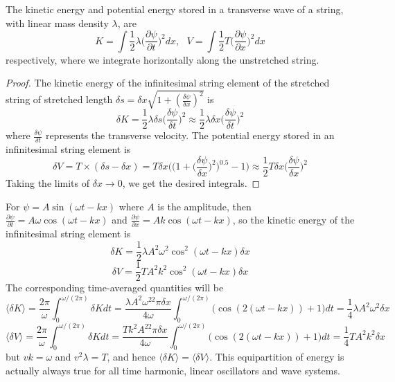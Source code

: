 \documentclass[a4paper]{article}
\begin{document}
\begin{thm}
The kinetic energy and potential energy stored in a transverse wave of a string, with linear mass density $\lambda$, are 
$$K=\int\frac{1}{2}\lambda\bigg(\frac{\partial\psi}{\partial t}\bigg)^2dx, \text{  }V=\int\frac{1}{2}T\bigg(\frac{\partial\psi}{\partial x}\bigg)^2dx$$
respectively, where we integrate horizontally along the unstretched string.
\end{thm}
\begin{proof}
The kinetic energy of the infinitesimal string element of the stretched string of stretched length $\delta s=\delta x\sqrt{1+(\frac{\delta\psi}{\delta x})^2}$ is
$$\delta K=\frac{1}{2}\lambda\delta s\bigg(\frac{\delta\psi}{\delta t}\bigg)^2\approx\frac{1}{2}\lambda\delta x\bigg(\frac{\delta\psi}{\delta t}\bigg)^2$$
where $\frac{\delta\psi}{\delta t}$ represents the transverse velocity.
The potential energy stored in an infinitesimal string element is
$$\delta V=T\times(\delta s-\delta x)=T\delta x\bigg(\bigg(1+\bigg(\frac{\delta\psi}{\delta x}\bigg)^2\bigg)^{0.5}-1\bigg)\approx\frac{1}{2}T\delta x\bigg(\frac{\delta\psi}{\delta x}\bigg)^2$$
Taking the limits of $\delta x\rightarrow0$, we get the desired integrals.
\end{proof}
\begin{eg}
For $\psi=A\sin(\omega t-kx)$ where $A$ is the amplitude, then $\frac{\partial\psi}{\partial t}=A\omega\cos(\omega t-kx)$ and $\frac{\partial\psi}{\partial x}=Ak\cos(\omega t-kx)$, so  the kinetic energy of the infinitesimal string element is
$$\delta K=\frac{1}{2}\lambda A^2\omega^2\cos^2(\omega t-kx)\delta x$$
$$\delta V=\frac{1}{2}TA^2k^2\cos^2(\omega t-kx)\delta x$$
The corresponding time-averaged quantities will be
$$\langle \delta K\rangle=\frac{2\pi}{\omega}\int_0^{\omega/(2\pi)}\delta Kdt=\frac{\lambda A^2\omega^22\pi\delta x}{4\omega}\int_0^{\omega/(2\pi)}\bigg(\cos(2(\omega t-kx))+1\bigg)dt=\frac{1}{4}\lambda A^2\omega^2\delta x$$
$$\langle \delta V\rangle=\frac{2\pi}{\omega}\int_0^{\omega/(2\pi)}\delta Kdt=\frac{Tk^2A^22\pi\delta x}{4\omega}\int_0^{\omega/(2\pi)}\bigg(\cos(2(\omega t-kx))+1\bigg)dt=\frac{1}{4}T A^2k^2\delta x$$
but $vk=\omega$ and $v^2\lambda=T$, and hence $\langle\delta K\rangle=\langle\delta V\rangle$. This equipartition of energy is actually always true for all time harmonic, linear oscillators and wave systems.
\end{eg}
\end{document}
